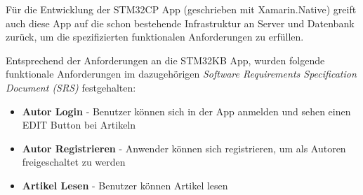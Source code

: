 	Für die Entwicklung der STM32CP App (geschrieben mit Xamarin.Native) greift auch diese App auf die schon bestehende Infrastruktur an Server und Datenbank zurück, um die spezifizierten funktionalen Anforderungen zu erfüllen.

	\newpage
	Entsprechend der Anforderungen an die STM32KB App, wurden folgende funktionale Anforderungen im dazugehörigen \textit{Software Requirements Specification Document (SRS)} festgehalten:
	\begin{itemize}
		\setlength\itemsep{0em}
		\item \textbf{Autor Login} - Benutzer können sich in der App anmelden und sehen einen EDIT Button bei Artikeln
		\item \textbf{Autor Registrieren} - Anwender können sich registrieren, um als Autoren freigeschaltet zu werden
		\item \textbf{Artikel Lesen} - Benutzer können Artikel lesen
	\end{itemize}

